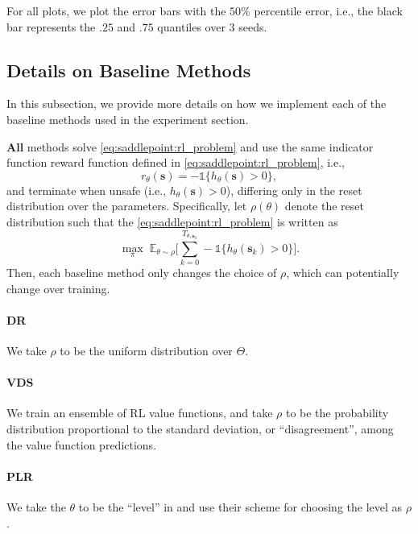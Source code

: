 \documentclass{article} %
\def\vb{{\bm{b}}}
\def\vx{{\bm{x}}}
\newcommand{\E}{\mathbb{E}}
\newcommand{\AlgDR}{\textcolor{MaterialPurple900}{\small\textsf{DR}}}
\newcommand{\AlgPLR}{\textcolor{MaterialPurple900}{\small\textsf{PLR}}}
\newcommand{\AlgVDS}{\textcolor{MaterialPurple900}{\small\textsf{VDS}}}
\newcommand{\ind}{\mathbb{1}}
\def\vx{{\vb{x}}}
\def\vx{{\bm{s}}}
\begin{document}
For all plots, we plot the error bars with the $50\%$ percentile error, i.e., the black bar represents the $.25$ and $.75$ quantiles over $3$ seeds.


\subsection{Details on Baseline Methods}  \label{app:experiment_details:baselines}

In this subsection, we provide more details on how we implement each of the baseline methods used in the experiment section.

\textbf{All} methods solve \eqref{eq:saddlepoint:rl_problem} and use the same indicator function reward function defined in \eqref{eq:saddlepoint:rl_problem}, i.e.,
\begin{equation}
    r_\theta(\vx) = -\ind\{ h_\theta(\vx) > 0 \},
\end{equation}
and terminate when unsafe (i.e., $h_\theta(\vx) > 0$), differing only in the reset distribution over the parameters.
Specifically, let $\rho(\theta)$ denote the reset distribution such that the \eqref{eq:saddlepoint:rl_problem} is written as
\begin{equation}
    \max_{\pi}\; \E_{\theta \sim \rho}\Big[ \sum_{k=0}^{T_{\theta, \vx_0}} -\ind\{ h_\theta(\vx_k) > 0 \} \Big].
\end{equation}
Then, each baseline method only changes the choice of $\rho$, which can potentially change over training.

\paragraph{\AlgDR{} \citep{tobin2017domain}}
We take $\rho$ to be the uniform distribution over $\Theta$.

\paragraph{\AlgVDS{} \citep{zhang2020automatic}}
We train an ensemble of RL value functions, and take $\rho$ to be the probability distribution proportional to the standard deviation, or ``disagreement'', among the value function predictions.

\paragraph{\AlgPLR{} \citep{jiang2021prioritized}}
We take the $\theta$ to be the ``level'' in \citep{jiang2021prioritized} and use their scheme for choosing the level as $\rho$.
\end{document}
